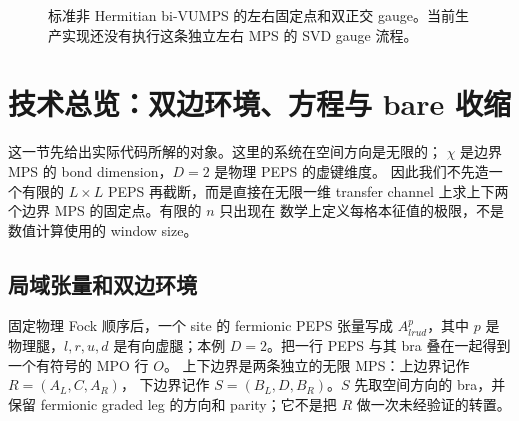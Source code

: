 \begin{figure}[htbp]
\centering
{}
\caption{标准非 Hermitian bi-VUMPS 的左右固定点和双正交 gauge。当前生产实现还没有执行这条独立左右 MPS 的 SVD gauge 流程。}
\label{fig:bi-vumps-flow}
\end{figure}

\section{技术总览：双边环境、方程与 bare 收缩}

这一节先给出实际代码所解的对象。这里的系统在空间方向是无限的；
$\chi$ 是边界 MPS 的 bond dimension，$D=2$ 是物理 PEPS 的虚键维度。
因此我们不先造一个有限的 $L\times L$ PEPS 再截断，而是直接在无限一维
transfer channel 上求上下两个边界 MPS 的固定点。有限的 $n$ 只出现在
数学上定义每格本征值的极限，不是数值计算使用的 window size。

\subsection{局域张量和双边环境}

固定物理 Fock 顺序后，一个 site 的 fermionic PEPS 张量写成
$A^p_{l r u d}$，其中 $p$ 是物理腿，$l,r,u,d$ 是有向虚腿；本例
$D=2$。把一行 PEPS 与其 bra 叠在一起得到一个有符号的 MPO 行 $O$。
上下边界是两条独立的无限 MPS：上边界记作 $R=(A_L,C,A_R)$，
下边界记作 $S=(B_L,D,B_R)$。$S$ 先取空间方向的 bra，并保留
fermionic graded leg 的方向和 parity；它不是把 $R$ 做一次未经验证的转置。

